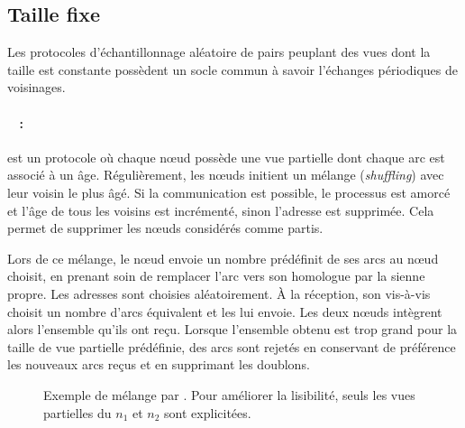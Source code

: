 \subsection{Taille fixe}
\label{net:subsec:fixed}

Les protocoles d'échantillonnage aléatoire de pairs peuplant des vues dont la
taille est constante possèdent un socle commun à savoir l'échanges périodiques
de voisinages.

\paragraph{\CYCLON~\cite{voulgaris2005cyclon} :} est un protocole où chaque nœud
possède une vue partielle dont chaque arc est associé à un âge. Régulièrement,
les nœuds initient un mélange (\emph{shuffling}) avec leur voisin le plus
âgé. Si la communication est possible, le processus est amorcé et l'âge de tous
les voisins est incrémenté, sinon l'adresse est supprimée. Cela permet de
supprimer les nœuds considérés comme partis.

\noindent Lors de ce mélange, le nœud envoie un nombre prédéfinit de ses arcs au
nœud choisit, en prenant soin de remplacer l'arc vers son homologue par la
sienne propre. Les adresses sont choisies aléatoirement. À la réception, son
vis-à-vis choisit un nombre d'arcs équivalent et les lui envoie. Les deux nœuds
intègrent alors l'ensemble qu'ils ont reçu. Lorsque l'ensemble obtenu est trop
grand pour la taille de vue partielle prédéfinie, des arcs sont rejetés en
conservant de préférence les nouveaux arcs reçus et en supprimant les doublons.
  
\begin{figure}
  \centering
  \hspace{35pt}
  \caption[Exemple de mélange dans \CYCLON]
  {\label{net:fig:cyclonexample} Exemple de mélange par \CYCLON. Pour
    améliorer la lisibilité, seuls les vues partielles du $n_1$ et $n_2$ sont
    explicitées.}
\end{figure}
  
